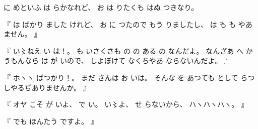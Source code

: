 %
に
めといふ
は%
らかなれど、
%
お
は
りたくも
はぬ
つきなり。

%
『
は
ばかり
ました
けれど、
%
お
に
つたので
もう
りましたし、
%
は
も
も
やあ
ません。
』

%
『
い〻ねえ%
い
は！。
%
も
いさくさも
の
の
ある
の
なんだよ。
%
なんざあ
へ
かうもんなら
は
が
いので、
%
しよぼけて
なくちやあ
ならないんだよ。
』

%
『
ホヽヽ
ばつかり！。
%
まだ
さんは
お
いは。
%
そんな
を
あつても
として
らつしやるぢありませんか。
』

%
『
オヤ
こそ
が
いよ、
%
で
い。
%
い〻よ、%
%
せ
らないから、
%
ハヽハヽハヽ。
』

%
『
でも
ほんたう
ですよ。
』

